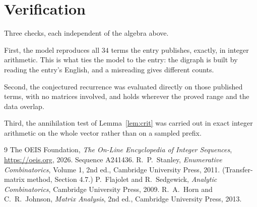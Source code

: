 \documentclass[11pt,a4paper]{article}
\theoremstyle{plain}
\theoremstyle{definition}
\begin{document}
\section{Verification}

Three checks, each independent of the algebra above.

First, the model reproduces all $34$ terms the entry publishes, exactly, in integer
arithmetic. This is what ties the model to the entry: the digraph is built by reading the
entry's English, and a misreading gives different counts.

Second, the conjectured recurrence was evaluated directly on those published terms, with no
matrices involved, and holds wherever the proved range and the data overlap.

Third, the annihilation test of Lemma~\ref{lem:crit} was carried out in exact integer
arithmetic on the whole vector rather than on a sampled prefix.

\begin{thebibliography}{9}
 The OEIS Foundation, \emph{The On-Line Encyclopedia of Integer
Sequences}, \url{https://oeis.org}, 2026. Sequence A241436.
 R.~P.~Stanley, \emph{Enumerative Combinatorics}, Volume 1, 2nd ed.,
Cambridge University Press, 2011. (Transfer-matrix method, Section 4.7.)
 P.~Flajolet and R.~Sedgewick, \emph{Analytic Combinatorics}, Cambridge
University Press, 2009.
 R.~A.~Horn and C.~R.~Johnson, \emph{Matrix Analysis}, 2nd ed., Cambridge
University Press, 2013.
\end{thebibliography}
\end{document}
